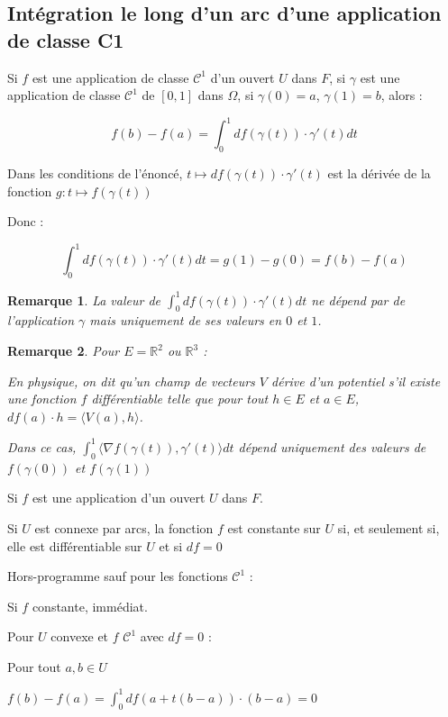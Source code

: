 \documentclass[a4paper,12pt]{book}
\newcommand{\Prop}[2]{\begin{tcolorbox}[sharp corners, colback=white,colframe=red!90!black!75, title=Proposition : #1]#2\end{tcolorbox}}
\newcommand{\Pre}[1]{\begin{tcolorbox}[sharp corners, colback=white,colframe=green!60!green!30!black!75, title=Preuve]#1\end{tcolorbox}}
\newtheorem{Rem}{Remarque}[section]
\def\R{\mathbb{R}}
\begin{document}
\subsection{Intégration le long d'un arc d'une application de classe C1}
\Prop{}{Si $f$ est une application de classe $\mathcal{C}^1$ d'un ouvert $U$ dans $F$, si $\gamma$ est une application de classe $\mathcal{C}^1$ de $[0,1]$ dans $\Omega$, si $\gamma(0)=a$, $\gamma(1)=b$, alors :
\par $$f(b)-f(a) = \int_0^1df(\gamma(t))\cdot\gamma'(t)dt$$}
\Pre{Dans les conditions de l'énoncé, $t\mapsto df(\gamma(t))\cdot\gamma'(t)$ est la dérivée de la fonction $g :t\mapsto f(\gamma(t))$
\par Donc :
\par $$\int_0^1df(\gamma(t))\cdot\gamma'(t)dt = g(1)-g(0) = f(b)-f(a)$$}
\begin{Rem}
La valeur de $\int_0^1df(\gamma(t))\cdot\gamma'(t)dt$ ne dépend par de l'application $\gamma$ mais uniquement de ses valeurs en $0$ et $1$.
\end{Rem}
\begin{Rem}
Pour $E=\R^2$ ou $\R^3$ :
\par En physique, on dit qu'un champ de vecteurs $V$ dérive d'un potentiel s'il existe une fonction $f$ différentiable telle que pour tout $h\in E$ et $a\in E$, $df(a)\cdot h = \langle V(a), h\rangle$.
\par Dans ce cas, $\int_0^1\langle\nabla f(\gamma(t)), \gamma'(t)\rangle dt$ dépend uniquement des valeurs de $f(\gamma(0))$ et $f(\gamma(1))$
\end{Rem}
\Prop{}{Si $f$ est une application d'un ouvert $U$ dans $F$.
\par Si $U$ est connexe par arcs, la fonction $f$ est constante sur $U$ si, et seulement si, elle est différentiable sur $U$ et si $df=0$}
\Pre{Hors-programme sauf pour les fonctions $\mathcal{C}^1$ :
\par Si $f$ constante, immédiat.
\par Pour $U$ convexe et $f$ $\mathcal{C}^1$ avec $df=0$ :
\par Pour tout $a, b\in U$
\par $f(b)-f(a) =\int_0^1 df(a+t(b-a))\cdot (b-a) = 0$}
\end{document}
